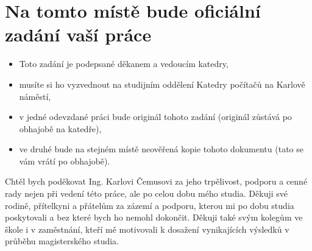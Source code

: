 \documentclass[11pt,twoside,a4paper]{book}
\theoremstyle{definition}
\begin{document}
\dptranslate                %

{
 \cleardoublepage \thispagestyle{empty}
\chapter*{Na tomto místě bude oficiální zadání vaší práce}
\begin{itemize}
\item Toto zadání je podepsané děkanem a vedoucím katedry,
\item musíte si ho vyzvednout na studijním oddělení Katedry počítačů na Karlově náměstí,
\item v jedné odevzdané práci bude originál tohoto zadání (originál zůstává po obhajobě na katedře),
\item ve druhé bude na stejném místě neověřená kopie tohoto dokumentu (tato se vám vrátí po obhajobě).
\end{itemize}
\newpage
}

\coverpagestarts


\acknowledgements
\noindent
Chtěl bych poděkovat Ing. Karlovi Čemusovi za jeho trpělivost, podporu a
cenné rady nejen při vedení této práce, ale po celou dobu mého studia.
Děkuji své rodině, přítelkyni a přátelům za zázemí a podporu, kterou
mi po dobu studia poskytovali a bez které bych ho nemohl dokončit.
Děkuji také svým kolegům ve škole i v zaměstnání, kteří mě motivovali k
dosažení vynikajících výsledků v průběhu magisterského studia.






\abstractpage

\end{document}
